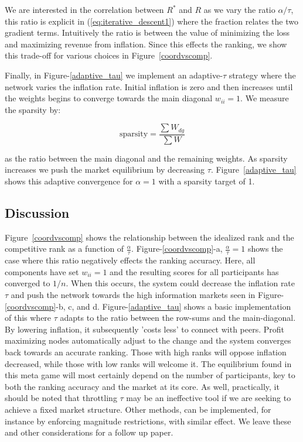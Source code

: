 \documentclass{article}
\begin{document}
We are interested in the correlation between $R^*$ and $R$ as we vary the ratio $\alpha/\tau$, this ratio is explicit in (\ref{eq:iterative_descent1}) where the fraction relates the two gradient terms. Intuitively the ratio is between the value of minimizing the loss and maximizing revenue from inflation. Since this effects the ranking, we show this trade-off for various choices in Figure~\ref{coordvscomp}. 

Finally, in Figure-\ref{adaptive_tau} we implement an adaptive-$\tau$ strategy where the network varies the inflation rate. Initial inflation is zero and then increases until the weights begins to converge towards the main diagonal $w_{ii}=1$. We measure the sparsity by: 

\begin{equation}
\text{sparsity} = \frac{\sum W_{dg}}{\sum W}
\end{equation}

as the ratio between the main diagonal and the remaining weights. As sparsity increases we push the market equilibrium by decreasing $\tau$. Figure~\ref{adaptive_tau} shows this adaptive convergence for $\alpha=1$ with a sparsity target of 1. 

\subsection{Discussion}

Figure~\ref{coordvscomp} shows the relationship between the idealized rank and the competitive rank as a function of $\frac{\alpha}{\tau}$. Figure-\ref{coordvscomp}-a, $\frac{\alpha}{\tau} = 1$ shows the case where this ratio negatively effects the ranking accuracy. Here, all components have set $w_{ii} = 1$ and the resulting scores for all participants has converged to $1/n$. When this occurs, the system could decrease the inflation rate $\tau$ and push the network towards the high information markets seen in Figure-\ref{coordvscomp}-b, c, and d. Figure-\ref{adaptive_tau} shows a basic implementation of this where $\tau$ adapts to the ratio between the row-sums and the main-diagonal. By lowering inflation, it subsequently 'costs less' to connect with peers. Profit maximizing nodes automatically adjust to the change and the system converges back towards an accurate ranking. Those with high ranks will oppose inflation decreased, while those with low ranks will welcome it. The equilibrium found in this meta game will most certainly depend on the number of participants, key to both the ranking accuracy and the market at its core. As well, practically, it should be noted that throttling $\tau$ may be an ineffective tool if we are seeking to achieve a fixed market structure. Other methods, can be implemented, for instance by enforcing magnitude restrictions, with similar effect. We leave these and other considerations for a follow up paper.
\end{document}
